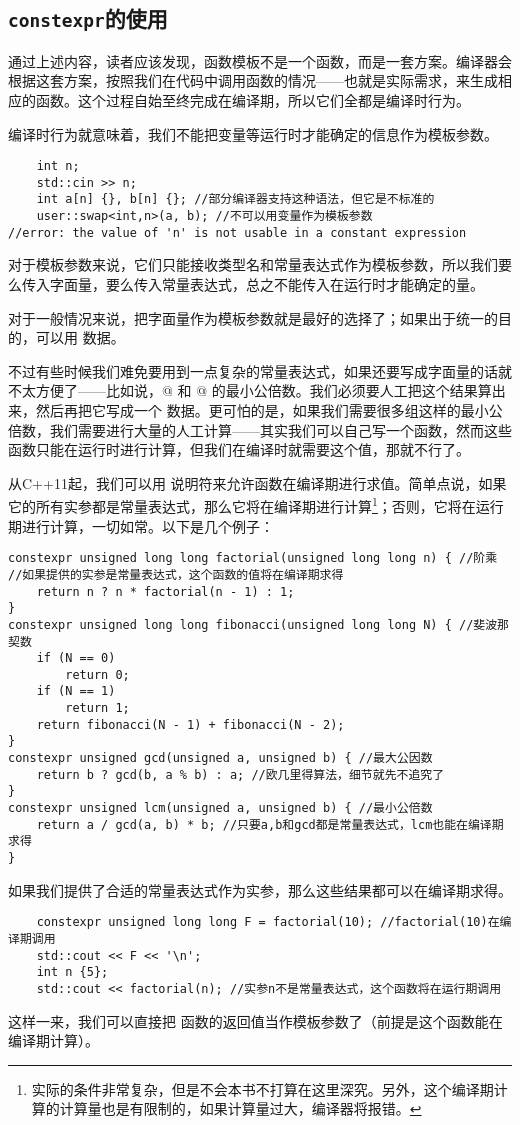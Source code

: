 \subsection*{\texttt{constexpr}的使用}
通过上述内容，读者应该发现，函数模板不是一个函数，而是一套方案。编译器会根据这套方案，按照我们在代码中调用函数的情况——也就是实际需求，来生成相应的函数。这个过程自始至终完成在编译期，所以它们全都是编译时行为。\par
编译时行为就意味着，我们不能把变量等运行时才能确定的信息作为模板参数。
\begin{lstlisting}
    int n;
    std::cin >> n;
    int a[n] {}, b[n] {}; //部分编译器支持这种语法，但它是不标准的
    user::swap<int,n>(a, b); //不可以用变量作为模板参数
//error: the value of 'n' is not usable in a constant expression
\end{lstlisting}
对于模板参数来说，它们只能接收类型名和常量表达式作为模板参数，所以我们要么传入字面量，要么传入常量表达式，总之不能传入在运行时才能确定的量。\par
对于一般情况来说，把字面量作为模板参数就是最好的选择了；如果出于统一的目的，可以用 \lstinline@constexpr@ 数据。\par
不过有些时候我们难免要用到一点复杂的常量表达式，如果还要写成字面量的话就不太方便了——比如说，@ 和 @ 的最小公倍数。我们必须要人工把这个结果算出来，然后再把它写成一个 \lstinline@constexpr@ 数据。更可怕的是，如果我们需要很多组这样的最小公倍数，我们需要进行大量的人工计算——其实我们可以自己写一个函数，然而这些函数只能在运行时进行计算，但我们在编译时就需要这个值，那就不行了。\par
从C++11起，我们可以用 \lstinline@constexpr@ 说明符来允许函数在编译期进行求值。简单点说，如果它的所有实参都是常量表达式，那么它将在编译期进行计算\footnote{实际的条件非常复杂，但是不会本书不打算在这里深究。另外，这个编译期计算的计算量也是有限制的，如果计算量过大，编译器将报错。}；否则，它将在运行期进行计算，一切如常。以下是几个例子：
\begin{lstlisting}
constexpr unsigned long long factorial(unsigned long long n) { //阶乘
//如果提供的实参是常量表达式，这个函数的值将在编译期求得
    return n ? n * factorial(n - 1) : 1;
}
constexpr unsigned long long fibonacci(unsigned long long N) { //斐波那契数
    if (N == 0)
        return 0;
    if (N == 1)
        return 1;
    return fibonacci(N - 1) + fibonacci(N - 2);
}
constexpr unsigned gcd(unsigned a, unsigned b) { //最大公因数
    return b ? gcd(b, a % b) : a; //欧几里得算法，细节就先不追究了
}
constexpr unsigned lcm(unsigned a, unsigned b) { //最小公倍数
    return a / gcd(a, b) * b; //只要a,b和gcd都是常量表达式，lcm也能在编译期求得
}
\end{lstlisting}
如果我们提供了合适的常量表达式作为实参，那么这些结果都可以在编译期求得。
\begin{lstlisting}
    constexpr unsigned long long F = factorial(10); //factorial(10)在编译期调用
    std::cout << F << '\n';
    int n {5};
    std::cout << factorial(n); //实参n不是常量表达式，这个函数将在运行期调用
\end{lstlisting}\par
这样一来，我们可以直接把 \lstinline@constexpr@ 函数的返回值当作模板参数了（前提是这个函数能在编译期计算）。\par
